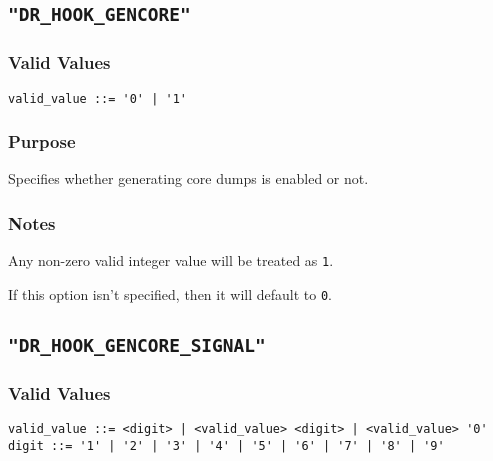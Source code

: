 

\subsection{\texttt{"DR\_HOOK\_GENCORE"}}
\label{section:flags:DR_HOOK_GENCORE}
\vspace{-2ex}
\subsubsection{Valid Values}
\vspace{-2ex}
\verb+valid_value ::= '0' | '1'+ 

\vspace{-2ex}
\subsubsection{Purpose}
\vspace{-2ex}
Specifies whether generating core dumps is enabled or not.

\vspace{-2ex}
\subsubsection{Notes}
\vspace{-2ex}
Any non-zero valid integer value will be treated as \verb|1|.

If this option isn't specified, then it will default to \verb|0|.



\subsection{\texttt{"DR\_HOOK\_GENCORE\_SIGNAL"}}
\label{section:flags:DR_HOOK_GENCORE_SIGNAL}
\vspace{-2ex}
\subsubsection{Valid Values}
\vspace{-2ex}
\verb+valid_value ::= <digit> | <valid_value> <digit> | <valid_value> '0'+ \\
\verb+digit ::= '1' | '2' | '3' | '4' | '5' | '6' | '7' | '8' | '9'+

\vspace{-2ex}
